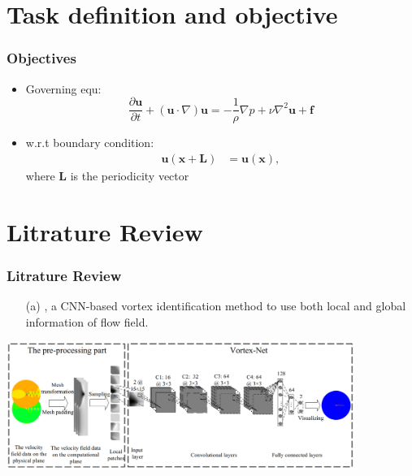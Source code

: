 \documentclass[aspectratio=169]{beamer}
\begin{document}
\section{Task definition and objective}
\begin{frame}
  \frametitle{Objectives}
  \begin{itemize}
    \item Governing equ:\\
      \begin{equation}
        \frac{\partial \mathbf{u}}{\partial t} + (\mathbf{u} \cdot \nabla)\mathbf{u} = -\frac{1}{\rho}\nabla p + \nu \nabla^2 \mathbf{u} + \mathbf{f}
      \end{equation}
    \item w.r.t boundary condition:\\
    \begin{align}
      \mathbf{u}(\mathbf{x} + \mathbf{L}) &= \mathbf{u}(\mathbf{x}),
    \end{align}
    where $\mathbf{L}$ is the periodicity vector
  \end{itemize}
\end{frame}
\section{Litrature Review}
\begin{frame}
  \frametitle{Litrature Review}
  \begin{itemize}
    \item[(a)]  \cite{Liang2018}, a CNN-based vortex identification method to use both local and global information of flow field.
  \end{itemize}
  \begin{center}
    \includegraphics[width=0.85\textwidth]{paper_review.png}
  \end{center}
\end{frame}
\end{document}
